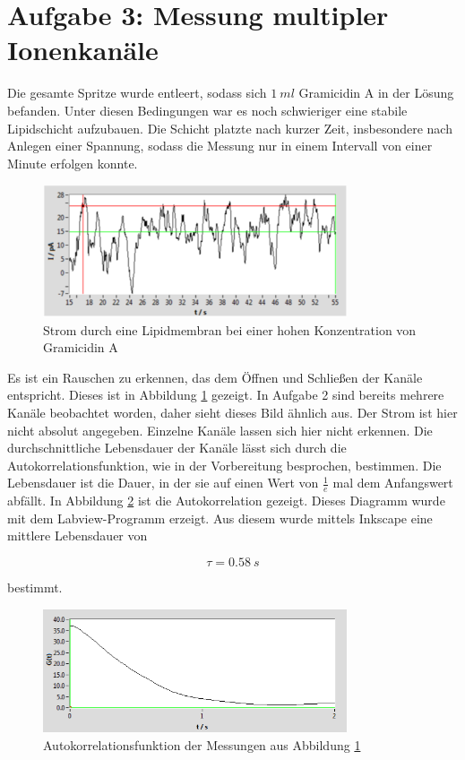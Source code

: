 \documentclass[a4paper,ngerman]{scrartcl}
\begin{document}
\clearpage


\section{Aufgabe 3: Messung multipler Ionenkanäle}

Die gesamte Spritze wurde entleert, sodass sich $\SI{1}{ml}$ Gramicidin A in der Lösung befanden. Unter diesen Bedingungen war es noch schwieriger eine stabile Lipidschicht aufzubauen.
Die Schicht platzte nach kurzer Zeit, insbesondere nach Anlegen einer Spannung, sodass die Messung nur in einem Intervall von einer Minute erfolgen konnte.

\begin{figure}[tbh!]
\includegraphics[width=0.8\textwidth]{abbildungen/mehrkanal_raw.png}
\caption{Strom durch eine Lipidmembran bei einer hohen Konzentration von Gramicidin A}
\label{fig:mehrkanal-roh}
\end{figure}


Es ist ein Rauschen zu erkennen, das dem Öffnen und Schließen der Kanäle entspricht. Dieses ist in Abbildung \ref{fig:mehrkanal-roh} gezeigt. In Aufgabe 2 sind bereits mehrere Kanäle beobachtet worden, daher sieht dieses Bild ähnlich aus. Der Strom ist hier nicht absolut angegeben. Einzelne Kanäle lassen sich hier nicht erkennen. Die durchschnittliche Lebensdauer der Kanäle lässt sich durch die Autokorrelationsfunktion, wie in der Vorbereitung besprochen, bestimmen. Die Lebensdauer ist die Dauer, in der sie auf einen Wert von $\frac{1}{e}$ mal dem Anfangswert abfällt. In Abbildung \ref{fig:mehrkanal-korrel} ist die Autokorrelation gezeigt. Dieses Diagramm wurde mit dem Labview-Programm erzeigt. Aus diesem wurde mittels Inkscape eine mittlere Lebensdauer von

\begin{equation}
\tau = \SI{0.58}{s}
\end{equation}

bestimmt.

\begin{figure}[tbh!]
\includegraphics[width=0.8\textwidth]{abbildungen/mehrkanal_korrel.png}
\caption{Autokorrelationsfunktion der Messungen aus Abbildung \ref{fig:mehrkanal-roh}}
\label{fig:mehrkanal-korrel}
\end{figure}
\end{document}
